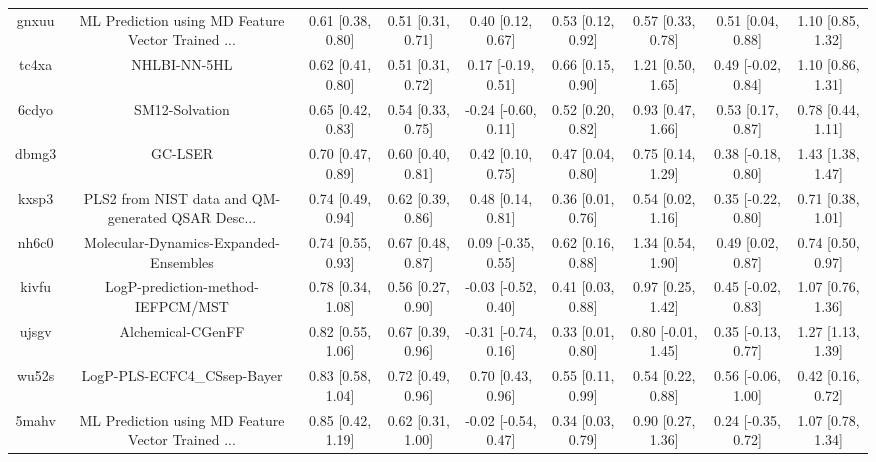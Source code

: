 \documentclass{article}
\begin{document}
\begin{center}
\begin{longtable}{|ccccccccc|}
 gnxuu &  ML Prediction using MD Feature Vector Trained ... &  0.61 [0.38, 0.80] &  0.51 [0.31, 0.71] &     0.40 [0.12, 0.67] &  0.53 [0.12, 0.92] &    0.57 [0.33, 0.78] &    0.51 [0.04, 0.88] &     1.10 [0.85, 1.32] \\
 tc4xa &                                       NHLBI-NN-5HL &  0.62 [0.41, 0.80] &  0.51 [0.31, 0.72] &    0.17 [-0.19, 0.51] &  0.66 [0.15, 0.90] &    1.21 [0.50, 1.65] &   0.49 [-0.02, 0.84] &     1.10 [0.86, 1.31] \\
 6cdyo &                                     SM12-Solvation &  0.65 [0.42, 0.83] &  0.54 [0.33, 0.75] &   -0.24 [-0.60, 0.11] &  0.52 [0.20, 0.82] &    0.93 [0.47, 1.66] &    0.53 [0.17, 0.87] &     0.78 [0.44, 1.11] \\
 dbmg3 &                                            GC-LSER &  0.70 [0.47, 0.89] &  0.60 [0.40, 0.81] &     0.42 [0.10, 0.75] &  0.47 [0.04, 0.80] &    0.75 [0.14, 1.29] &   0.38 [-0.18, 0.80] &     1.43 [1.38, 1.47] \\
 kxsp3 &  PLS2 from NIST data and QM-generated QSAR Desc... &  0.74 [0.49, 0.94] &  0.62 [0.39, 0.86] &     0.48 [0.14, 0.81] &  0.36 [0.01, 0.76] &    0.54 [0.02, 1.16] &   0.35 [-0.22, 0.80] &     0.71 [0.38, 1.01] \\
 nh6c0 &              Molecular-Dynamics-Expanded-Ensembles &  0.74 [0.55, 0.93] &  0.67 [0.48, 0.87] &    0.09 [-0.35, 0.55] &  0.62 [0.16, 0.88] &    1.34 [0.54, 1.90] &    0.49 [0.02, 0.87] &     0.74 [0.50, 0.97] \\
 kivfu &                  LogP-prediction-method-IEFPCM/MST &  0.78 [0.34, 1.08] &  0.56 [0.27, 0.90] &   -0.03 [-0.52, 0.40] &  0.41 [0.03, 0.88] &    0.97 [0.25, 1.42] &   0.45 [-0.02, 0.83] &     1.07 [0.76, 1.36] \\
 ujsgv &                                  Alchemical-CGenFF &  0.82 [0.55, 1.06] &  0.67 [0.39, 0.96] &   -0.31 [-0.74, 0.16] &  0.33 [0.01, 0.80] &   0.80 [-0.01, 1.45] &   0.35 [-0.13, 0.77] &     1.27 [1.13, 1.39] \\
 wu52s &                        LogP-PLS-ECFC4\_CSsep-Bayer &  0.83 [0.58, 1.04] &  0.72 [0.49, 0.96] &     0.70 [0.43, 0.96] &  0.55 [0.11, 0.99] &    0.54 [0.22, 0.88] &   0.56 [-0.06, 1.00] &     0.42 [0.16, 0.72] \\
 5mahv &  ML Prediction using MD Feature Vector Trained ... &  0.85 [0.42, 1.19] &  0.62 [0.31, 1.00] &   -0.02 [-0.54, 0.47] &  0.34 [0.03, 0.79] &    0.90 [0.27, 1.36] &   0.24 [-0.35, 0.72] &     1.07 [0.78, 1.34] \\

\end{longtable}
\end{center}
\end{document}
